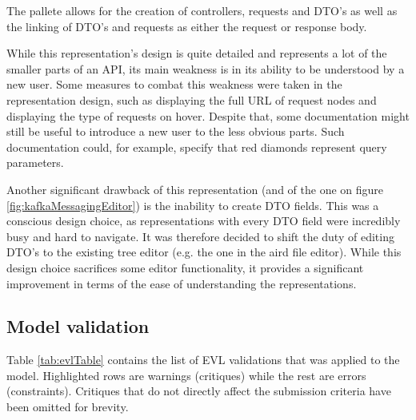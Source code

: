 \documentclass[parskip=full]{article}
\begin{document}
    The pallete allows for the creation of controllers, requests and DTO's as well as the linking of DTO's and requests as either the request or response body.

    While this representation's design is quite detailed and represents a lot of the smaller parts of an API, its main weakness is in its ability to be understood by a new user.
    Some measures to combat this weakness were taken in the representation design, such as displaying the full URL of request nodes and displaying the type of requests on hover.
    Despite that, some documentation might still be useful to introduce a new user to the less obvious parts.
    Such documentation could, for example, specify that red diamonds represent query parameters.

    Another significant drawback of this representation (and of the one on figure \ref{fig:kafkaMessagingEditor}) is the inability to create DTO fields.
    This was a conscious design choice, as representations with every DTO field were incredibly busy and hard to navigate.
    It was therefore decided to shift the duty of editing DTO's to the existing tree editor (e.g. the one in the aird file editor).
    While this design choice sacrifices some editor functionality, it provides a significant improvement in terms of the ease of understanding the representations.
    \pagebreak
    \subsection{Model validation}
    Table \ref{tab:evlTable} contains the list of EVL validations that was applied to the model.
    Highlighted rows are warnings (critiques) while the rest are errors (constraints).
    Critiques that do not directly affect the submission criteria have been omitted for brevity.
\end{document}
